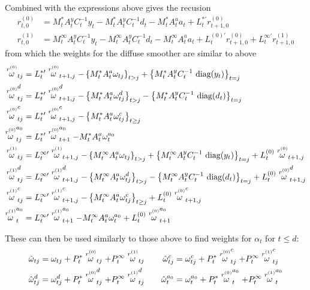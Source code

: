 \documentclass[12pt]{article}
\begin{document}
	Combined with the expressions above gives the recusion
	\begin{align*}
	r_{t,0}^{(0)} &= M_t^* A_t^y C_t^{-1} y_t - M_t^* A_t^y C_t^{-1} d_t - M_t^* A_t^a a_t + L_t^{*\prime} r_{t+1,0}^{(0)} \\
	r_{t,0}^{(1)} &= M_t^\infty A_t^y C_t^{-1} y_t - M_t^\infty A_t^y C_t^{-1} d_t - M_t^\infty A_t^a a_t + L_t^{(0)\prime} r_{t+1,0}^{(0)} + L_t^{\infty\prime} r_{t+1,0}^{(1)} 
	\end{align*}
	from which the weights for the diffuse smoother are similar to above
	\begin{align*}
	\stackrel{r^{(0)}}{\omega}_{tj} &= L_t^{*\prime} \stackrel{r^{(0)}}{\omega}_{t+1,j} - \left\{ M_t^* A_t^a \omega_{tj} \right\}_{t>j} + \left\{M_t^* A_t^y C_t^{-1} \text{ diag} (y_t) \right\}_{t=j} \\
	\stackrel{r^{(0)}}{\omega}_{tj}^d &= L_t^{*\prime} \stackrel{r^{(0)}}{\omega}_{t+1,j}^d - \left\{ M_t^* A_t^a \omega_{tj}^d \right\}_{t>j} - \left\{M_t^* A_t^y C_t^{-1} \text{ diag} (d_t) \right\}_{t=j} \\
	\stackrel{r^{(0)}}{\omega}_{tj}^c &= L_t^{*\prime} \stackrel{r^{(0)}}{\omega}_{t+1,j}^c - \left\{ M_t^* A_t^a \omega_{tj}^c \right\}_{t \geq j} \\
	\stackrel{r^{(0)}}{\omega}_{tj}^{a_0} &= L_t^{*\prime} \stackrel{r^{(0)}}{\omega}_{t+1}^{a_0} - M_t^* A_t^a \omega_{t}^{a_0} \\
	\stackrel{r^{(1)}}{\omega}_{tj} &= L_t^{\infty\prime} \stackrel{r^{(1)}}{\omega}_{t+1,j} - \left\{ M_t^\infty A_t^a \omega_{tj} \right\}_{t>j} + \left\{M_t^\infty A_t^y C_t^{-1} \text{ diag} (y_t) \right\}_{t=j} + L_t^{(0)} \stackrel{r^{(0)}}{\omega}_{t+1,j} \\
	\stackrel{r^{(1)}}{\omega}_{tj}^d &= L_t^{\infty\prime} \stackrel{r^{(1)}}{\omega}_{t+1,j}^d - \left\{ M_t^\infty A_t^a \omega_{tj}^d \right\}_{t>j} - \left\{M_t^\infty A_t^y C_t^{-1} \text{ diag} (d_t) \right\}_{t=j} + L_t^{(0)} \stackrel{r^{(0)}}{\omega}_{t+1,j}^d \\
	\stackrel{r^{(1)}}{\omega}_{tj}^c &= L_t^{\infty\prime} \stackrel{r^{(1)}}{\omega}_{t+1,j}^c - \left\{ M_t^\infty A_t^a \omega_{tj}^c \right\}_{t \geq j} + L_t^{(0)} \stackrel{r^{(0)}}{\omega}_{t+1,j}^c \\
	\stackrel{r^{(1)}}{\omega}_{t}^{a_0} &= L_t^{\infty\prime} \stackrel{r^{(1)}}{\omega}_{t+1}^{a_0} - M_t^\infty A_t^a \omega_{t}^{a_0} + L_t^{(0)} \stackrel{r^{(0)}}{\omega}_{t+1}^{a_0}
	\end{align*}

	These can then be used similarly to those above to find weights for $\alpha_t$ for $t \leq d$:
	\begin{align*}
	\hat{\omega}_{tj} &= \omega_{tj} + P_t^* \stackrel{r^{(0)}}{\omega}_{tj} + P_t^\infty \stackrel{r^{(1)}}{\omega}_{tj} &\quad 
	\hat{\omega}_{tj}^c &= \omega_{tj}^c + P_t^* \stackrel{r^{(0)}}{\omega}_{tj}^c + P_t^\infty \stackrel{r^{(1)}}{\omega}_{tj}^c\\
	 \hat{\omega}_{tj}^d &= \omega_{tj}^d + P_t^* \stackrel{r^{(0)}}{\omega}_{tj}^d + P_t^\infty \stackrel{r^{(1)}}{\omega}_{tj}^d &\quad 
	 \hat{\omega}_t^{a_0} &= \omega_t^{a_0} + P_t^* \stackrel{r^{(0)}}{\omega}_t^{a_0}  + P_t^\infty \stackrel{r^{(1)}}{\omega}_t^{a_0} 
	\end{align*}
	
\end{document}
